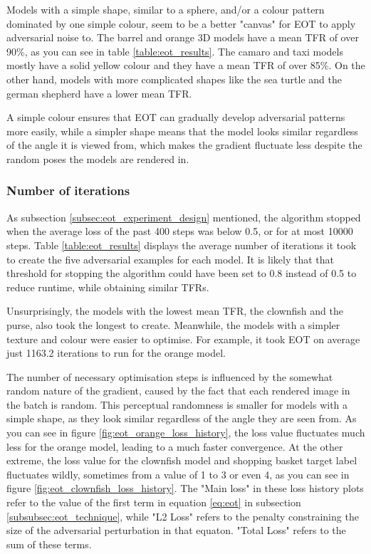 Models with a simple shape, similar to a sphere, and/or a colour pattern dominated by one simple colour, seem to be a better "canvas" for EOT to apply adversarial noise to. The barrel and orange 3D models have a mean TFR of over 90\%, as you can see in table \ref{table:eot_results}. The camaro and taxi models mostly have a solid yellow colour and they have a mean TFR of over 85\%. On the other hand, models with more complicated shapes like the sea turtle and the german shepherd have a lower mean TFR. 

A simple colour ensures that EOT can gradually develop adversarial patterns more easily, while a simpler shape means that the model looks similar regardless of the angle it is viewed from, which makes the gradient fluctuate less despite the random poses the models are rendered in.

\subsubsection{Number of iterations}

As subsection \ref{subsec:eot_experiment_design} mentioned, the algorithm stopped when the average loss of the past 400 steps was below 0.5, or for at most 10000 steps. Table \ref{table:eot_results} displays the average number of iterations it took to create the five adversarial examples for each model. It is likely that that threshold for stopping the algorithm could have been set to 0.8 instead of 0.5 to reduce runtime, while obtaining similar TFRs.

Unsurprisingly, the models with the lowest mean TFR, the clownfish and the purse, also took the longest to create. Meanwhile, the models with a simpler texture and colour were easier to optimise. For example, it took EOT on average just 1163.2 iterations to run for the orange model. 

The number of necessary optimisation steps is influenced by the somewhat random nature of the gradient, caused by the fact that each rendered image in the batch is random. This perceptual randomness is smaller for models with a simple shape, as they look similar regardless of the angle they are seen from. As you can see in figure \ref{fig:eot_orange_loss_history}, the loss value fluctuates much less for the orange model, leading to a much faster convergence. At the other extreme, the loss value for the clownfish model and shopping basket target label fluctuates wildly, sometimes from a value of 1 to 3 or even 4, as you can see in figure \ref{fig:eot_clownfish_loss_history}. The "Main loss" in these loss history plots refer to the value of the first term in equation \ref{eq:eot} in subsection \ref{subsubsec:eot_technique}, while "L2 Loss" refers to the penalty constraining the size of the adversarial perturbation in that equaton. "Total Loss" refers to the sum of these terms.

